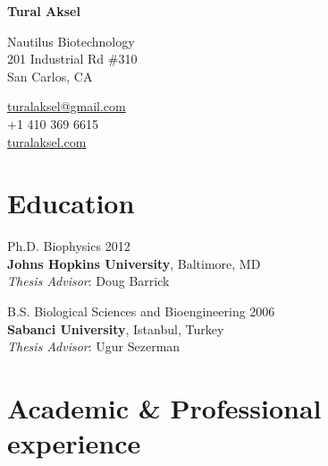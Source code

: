 \documentclass[12pt,letterpaper]{report}
\newcommand{\myname}{Tural Aksel}
\newcommand{\namefont}[1]{{\normalfont\bfseries\Huge{#1}}}
\begin{document}
    \raggedright{}

    \namefont{\myname}

    \vspace{1em}
    \begin{minipage}[t]{0.700\textwidth}
        Nautilus Biotechnology \\
        201 Industrial Rd \#310 \\
        San Carlos, CA \\
    \end{minipage}
    \begin{minipage}[t]{0.295\textwidth}
        \flushright{}
        \href{mailto:turalaksel@ngmail.com}{turalaksel@gmail.com} \\
        +1 410 369 6615 \\
        \href{https://turalaksel.com}{turalaksel.com}
    \end{minipage}


    \section*{Education}

    \begin{tablist}

        \item[Ph.D.] \tab{}Biophysics \hfill 2012\\
        \textbf{Johns Hopkins University}, Baltimore, MD\\
        \textit{Thesis Advisor}: Doug Barrick 
        
        \item[B.S.]  \tab{}Biological Sciences and Bioengineering \hfill 2006\\
        \textbf{Sabanci University}, Istanbul, Turkey\\
        \textit{Thesis Advisor}: Ugur Sezerman

    \end{tablist}



    \section*{Academic \& Professional experience}
\end{document}
